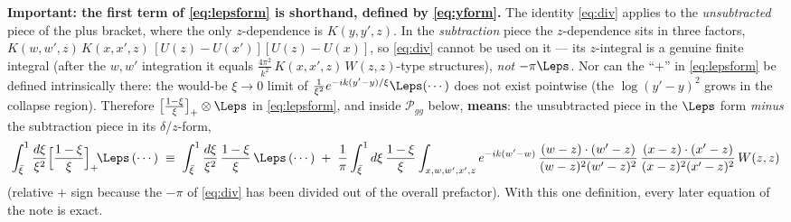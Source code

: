 \documentclass[9pt]{article}
\numberwithin{equation}{section}
\begin{document}
{\color{red}\textbf{Important: the first term of \eqref{eq:lepsform} is shorthand, defined by
\eqref{eq:yform}.} The identity \eqref{eq:div} applies to the \emph{unsubtracted} piece of the
plus bracket, where the only $z$-dependence is $K(y,y',z)$. In the \emph{subtraction} piece
the $z$-dependence sits in three factors,
$K(w,w',z)\,K(x,x',z)\,[U(z)-U(x')][U(z)-U(x)]$, so \eqref{eq:div} cannot be used on it ---
its $z$-integral is a genuine finite integral (after the $w,w'$ integration it equals
$\frac{4\pi^{2}}{k^{2}}\,K(x,x',z)\,W(z,z)$-type structures), \emph{not} $-\pi\Leps$. Nor can
the ``$+$'' in \eqref{eq:lepsform} be defined intrinsically there: the would-be $\xi\to0$ limit
of $\frac{1}{\xi^{2}}e^{-ik(y'-y)/\xi}\Leps(\cdots)$ does not exist pointwise (the
$\log(y'-y)^{2}$ grows in the collapse region). Therefore
$\big[\frac{1-\xi}{\xi}\big]_{+}\otimes\Leps$ in \eqref{eq:lepsform}, and inside
$\mathcal P_{gg}$ below, \textbf{means}: the unsubtracted piece in the $\Leps$ form
\emph{minus} the subtraction piece in its $\delta$/$z$-form,
\begin{align*}
\int_{\bar\xi}^{1}\frac{d\xi}{\xi^{2}}\Big[\frac{1-\xi}{\xi}\Big]_{+}\!\Leps\,(\cdots)
\;\equiv\;
\int_{\bar\xi}^{1}\frac{d\xi}{\xi^{2}}\,\frac{1-\xi}{\xi}\,\Leps\,(\cdots)
\;+\;\frac{1}{\pi}\int_{\bar\xi}^{1}d\xi\,\frac{1-\xi}{\xi}
\int_{x,w,w',x',z}e^{-ik(w'-w)}\,\frac{(w-z)\cdot(w'-z)}{(w-z)^{2}(w'-z)^{2}}\,
\frac{(x-z)\cdot(x'-z)}{(x-z)^{2}(x'-z)^{2}}\,W(z,z)
\end{align*}
(relative $+$ sign because the $-\pi$ of \eqref{eq:div} has been divided out of the overall
prefactor). With this one definition, every later equation of the note is exact.}
\end{document}
